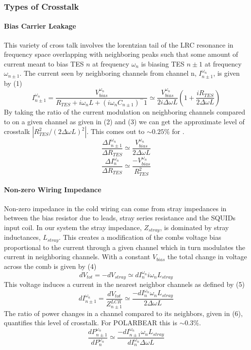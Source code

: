 \subsubsection{Types of Crosstalk}
\setcounter{equation}{0}
\paragraph{Bias Carrier Leakage}
This variety of cross talk involves the lorentzian tail of the LRC resonance in frequency space overlapping with neighboring peaks such that some amount of current meant to bias TES $n$ at frequency $\omega_n$ is biasing TES $n\pm1$ at frequency $\omega_{n\pm1}$. The current seen by neighboring channels from channel n, $I^{\omega_n}_{n\pm1}$, is given by (1)
\begin{equation}
I^{\omega_n}_{n\pm1} = \frac{V^{\omega_n}_{bias}}{R_{TES}+i\omega_nL+(i\omega_nC_{n\pm1})^-1} \simeq \frac{V^{\omega_n}_{bias}}{2i\Delta\omega L}\left(1+\frac{iR_{TES}}{2\Delta\omega L}\right)
\end{equation}
By taking the ratio of the current modulation on neighboring channels compared to on a given channel as given in (2) and (3) we can get  the approximate level of crosstalk $|R^2_{TES}/(2\Delta \omega L)^2|$. This comes out to $\sim0.25\%$ for \pb.
\begin{equation}
\frac{\Delta I^{\omega_n}_{n\pm1}}{\Delta R_{TES}} \simeq \frac{V^{\omega_n}_{bias}}{2\Delta\omega L}
\end{equation}
\begin{equation}
\frac{\Delta I^{\omega_n}_{n}}{\Delta R_{TES}} \simeq \frac{-V^{\omega_n}_{bias}}{R^2_{TES}}
\end{equation}

\paragraph{Non-zero Wiring Impedance}
Non-zero impedance in the cold wiring can come from stray impedances in between the bias resistor due to leads, stray series resistance and the SQUIDs input coil. In our system the stray impedance, $Z_{stray}$, is dominated by stray inductances, $L_{stray}$. This creates a modification of the combs voltage bias proportional to the current through a given channel which in turn modulates the current in neighboring channels. With a constant $V_{bias}$ the total change in voltage across the comb is given by (4)
\begin{equation}
dV_{tot}=-dV_{stray}\simeq dI^{\omega_n}_{n}i\omega_nL_{stray}
\end{equation}
This voltage induces a current in the nearest neighbor channels as defined by (5)
\begin{equation}
dI^{\omega_n}_{n\pm1}=\frac{dV_{tot}}{Z^{LCR}_{n\pm1}}\simeq \frac{-dI^{\omega_n}_{n}\omega_nL_{stray}}{2\Delta \omega L}
\end{equation}
The ratio of power changes in a channel compared to its neighbors, given in (6), quantifies this level of crosstalk. For POLARBEAR this is $\sim0.3\%$.
\begin{equation}
\frac{dP^{\omega_n}_{n\pm1}}{dP^{\omega_n}_{n}}\simeq \frac{-dI^{\omega_n}_{n\pm1}\omega_nL_{stray}}{dI^{\omega_n}_{n}\Delta\omega L}
\end{equation}
